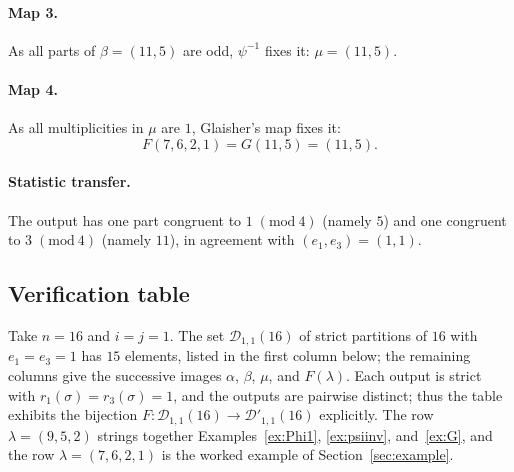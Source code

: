 \documentclass[11pt]{amsart}
\theoremstyle{definition}
\theoremstyle{remark}
\newcommand{\D}{\mathcal D}
\newcommand{\modulo}[1]{\;(\mathrm{mod}\ #1)}
\begin{document}
\paragraph{Map 3.}
As all parts of $\beta=(11,5)$ are odd, $\psi^{-1}$ fixes it: \(\mu=(11,5)\).

\paragraph{Map 4.}
As all multiplicities in \(\mu\) are \(1\), Glaisher's map fixes it:
\[
   F(7,6,2,1)=G(11,5)=(11,5).
\]
\paragraph{Statistic transfer.} The output has one part congruent to \(1\modulo 4\) (namely \(5\)) and one congruent to \(3\modulo 4\) (namely \(11\)), in agreement with \((e_1,e_3)=(1,1)\).

\subsection{Verification table}\label{sec:table}

Take $n=16$ and $i=j=1$. The set $\D_{1,1}(16)$ of strict partitions of $16$ with $e_1=e_3=1$ has $15$ elements, listed in the first column below; the remaining columns give the successive images $\alpha$, $\beta$, $\mu$, and $F(\lambda)$. Each output is strict with \(r_1(\sigma)=r_3(\sigma)=1\), and the outputs are pairwise distinct; thus the table exhibits the bijection \(F:\D_{1,1}(16)\to\D'_{1,1}(16)\) explicitly. The row $\lambda=(9,5,2)$ strings together Examples~\ref{ex:Phi1}, \ref{ex:psiinv}, and~\ref{ex:G}, and the row $\lambda=(7,6,2,1)$ is the worked example of Section~\ref{sec:example}.
\end{document}
